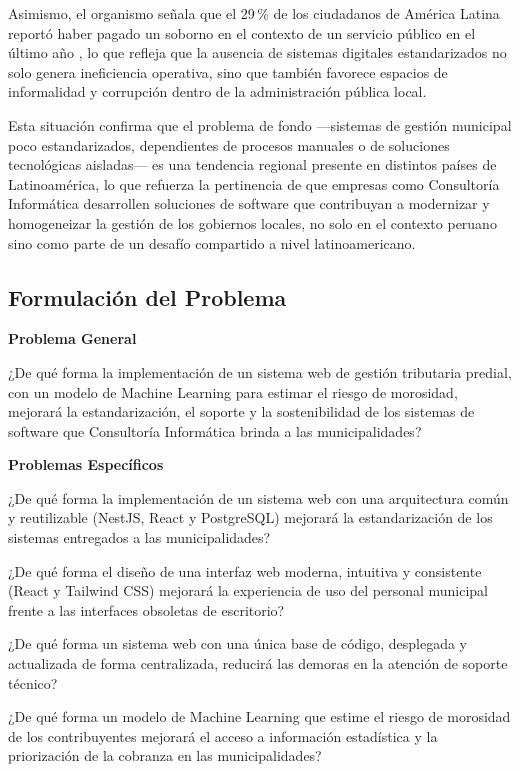 \documentclass[12pt,a4paper]{report}
\begin{document}
Asimismo, el organismo señala que el 29\,\% de los ciudadanos de América Latina reportó haber pagado un soborno en el contexto de un servicio público en el último año \parencite{bid2018}, lo que refleja que la ausencia de sistemas digitales estandarizados no solo genera ineficiencia operativa, sino que también favorece espacios de informalidad y corrupción dentro de la administración pública local.

Esta situación confirma que el problema de fondo —sistemas de gestión municipal poco estandarizados, dependientes de procesos manuales o de soluciones tecnológicas aisladas— es una tendencia regional presente en distintos países de Latinoamérica, lo que refuerza la pertinencia de que empresas como Consultoría Informática desarrollen soluciones de software que contribuyan a modernizar y homogeneizar la gestión de los gobiernos locales, no solo en el contexto peruano sino como parte de un desafío compartido a nivel latinoamericano.

\subsection{Formulación del Problema}

\textbf{Problema General}

\medskip
¿De qué forma la implementación de un sistema web de gestión tributaria predial, con un modelo de Machine Learning para estimar el riesgo de morosidad, mejorará la estandarización, el soporte y la sostenibilidad de los sistemas de software que Consultoría Informática brinda a las municipalidades?

\bigskip
\textbf{Problemas Específicos}

\medskip
¿De qué forma la implementación de un sistema web con una arquitectura común y reutilizable (NestJS, React y PostgreSQL) mejorará la estandarización de los sistemas entregados a las municipalidades?

\medskip
¿De qué forma el diseño de una interfaz web moderna, intuitiva y consistente (React y Tailwind CSS) mejorará la experiencia de uso del personal municipal frente a las interfaces obsoletas de escritorio?

\medskip
¿De qué forma un sistema web con una única base de código, desplegada y actualizada de forma centralizada, reducirá las demoras en la atención de soporte técnico?

\medskip
¿De qué forma un modelo de Machine Learning que estime el riesgo de morosidad de los contribuyentes mejorará el acceso a información estadística y la priorización de la cobranza en las municipalidades?
\end{document}
